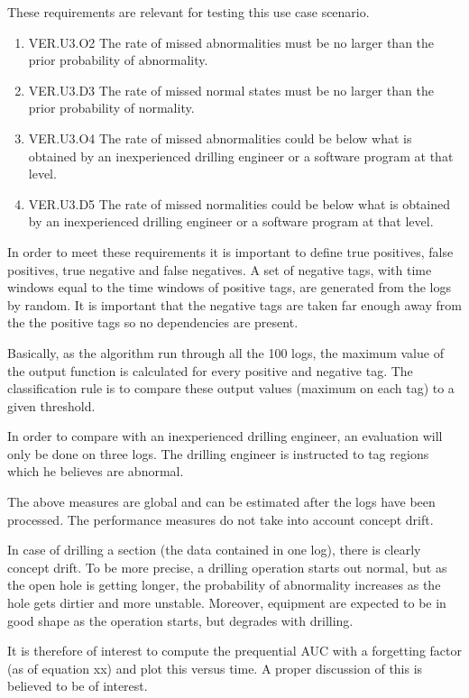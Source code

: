 \documentclass{article}
\theoremstyle{theorem}
\theoremstyle{definition}
\begin{document}
These requirements are relevant for testing this use case scenario.  
\begin{enumerate}
\item VER.U3.O2 The rate of missed abnormalities must be no larger than the prior probability of abnormality.  
\item VER.U3.D3 The rate of missed normal states must be no larger than the prior probability of normality.  
\item VER.U3.O4  The rate of missed abnormalities could be below what is obtained by an inexperienced drilling engineer or a software program at that level. 
\item VER.U3.D5 The rate of missed normalities could be below what is obtained by an inexperienced drilling engineer or a software program at that level.
\end{enumerate}

In order to meet these requirements it is important to define true positives, false positives, true negative and false negatives.  A set of negative tags, with time windows equal to the time windows of positive tags, are generated from the logs by random.  It is important that the negative tags are taken far enough away from the the positive tags so no dependencies are present.  

Basically, as the algorithm run through all the 100 logs, the maximum value of the output function is calculated for every positive and negative tag.  The classification rule is to compare these output values (maximum on each tag) to a given threshold.  

In order to compare with an inexperienced drilling engineer, an evaluation will only be done on three logs.  The drilling engineer is instructed to tag regions which he believes are abnormal.

The above measures are global and can be estimated after the logs have been processed.  The performance measures do not take into account concept drift.  

In case of drilling a section (the data contained in one log), there is clearly concept drift.  To be more precise, a drilling operation starts out normal, but as the open hole is getting longer, the probability of abnormality increases as the hole gets dirtier and more unstable. Moreover, equipment are expected to be in good shape as the operation starts, but degrades with drilling.  

It is therefore of interest to compute the prequential AUC with a forgetting factor (as of equation xx) and plot this versus time.  A proper discussion of this is believed to be of interest.
\end{document}
